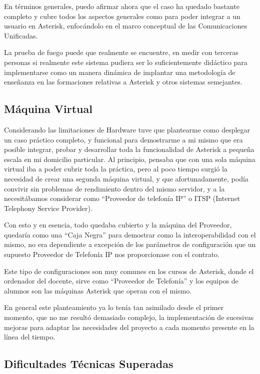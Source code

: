 En términos generales, puedo afirmar ahora que el caso ha quedado bastante completo y cubre todos los aspectos generales como para poder integrar a un usuario en Asterisk, enfocándolo en el marco conceptual de las Comunicaciones Unificadas.

La prueba de fuego puede que realmente se encuentre, en medir con terceras personas si realmente este sistema pudiera ser lo suficientemente didáctico para implementarse como un manera dinámica de implantar una metodología de enseñanza en las formaciones relativas a Asterisk y otros sistemas semejantes.

\subsection{Máquina Virtual}

Considerando las limitaciones de Hardware tuve que plantearme como desplegar un caso práctico completo, y funcional para demostrarme a mi mismo que era posible integrar, probar y desarrollar toda la funcionalidad de Asterisk a pequeña escala en mi domicilio particular. Al principio, pensaba que con una sola máquina virtual iba a poder cubrir toda la práctica, pero al poco tiempo surgió la necesidad de crear una segunda máquina virtual, y que afortunadamente, podía convivir sin problemas de rendimiento dentro del mismo servidor, y a la necesitábamos considerar como ``Proveedor de telefonía IP'' o ITSP (Internet Telephony Service Provider). 

Con esto y en esencia, todo quedaba cubierto y la máquina del Proveedor, quedaría como una ``Caja Negra'' para demostrar como la interoperabilidad con el mismo, no era dependiente a excepción de los parámetros de configuración que un supuesto Proveedor de Telefonía IP nos proporcionase con el contrato.

Este tipo de configuraciones son muy comunes en los cursos de Asterisk, donde el ordenador del docente, sirve como ``Proveedor de Telefonía'' y los equipos de alumnos son las máquinas Asterisk que operan con el mismo.

En general este planteamiento ya lo tenía tan asimilado desde el primer momento, que no me resultó demasiado complejo, la implementación de sucesivas mejoras para adaptar las necesidades del proyecto a cada momento presente en la línea del tiempo.

\subsection{Dificultades Técnicas Superadas}

